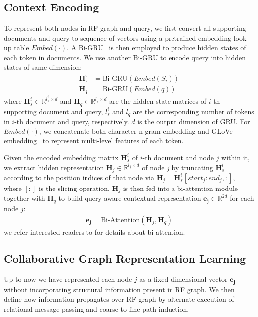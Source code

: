 \subsection{Context Encoding}
To represent both nodes in RF graph and query, we first convert all supporting documents and query to sequence of vectors using a pretrained embedding look-up table $Embed(\cdot)$. A Bi-GRU~\cite{DBLP:journals/corr/ChungGCB14} is then employed to produce hidden states of each token in documents. We use another Bi-GRU to encode query into hidden states of same dimension:
\begin{align}
	\bm{H}_s^i &= \text{Bi-GRU}(Embed(S_i)) \\
	\bm{H}_q &= \text{Bi-GRU}(Embed(q))
\end{align}
where $\bm{H}_s^i\in \mathbb{R}^{l_s^i\times d}$ and $\bm{H}_q\in \mathbb{R}^{l_q\times d}$ are the hidden state matrices of $i$-th supporting document and query, $l_s^i$ and $l_q$ are the corresponding number of tokens in $i$-th document and query, respectively. $d$ is the output dimension of GRU. For $Embed(\cdot)$, we concatenate both character n-gram embedding and GLoVe embedding~\cite{pennington2014glove} to represent multi-level features of each token.

Given the encoded embedding matrix $\bm{H}_s^i$ of $i$-th document and node $j$ within it, we extract hidden representation $\bm{H}_j\in \mathbb{R}^{l_j\times d}$ of node $j$ by truncating $\bm{H}_s^i$ according to the position indices of that node via $\bm{H}_j = \bm{H}_s^i[start_j:end_j, :]$,
where $[:]$ is the slicing operation. $\bm{H}_j$ is then fed into a bi-attention module~\cite{Zhong2019} together with $\bm{H}_q$ to build query-aware contextual representation $\bm{e_j}\in \mathbb{R}^{2d}$ for each node $j$:
\begin{align}
	\bm{e_j} = \text{Bi-Attention}(\bm{H}_j, \bm{H}_q)
\end{align}
we refer interested readers to \cite{Zhong2019} for details about bi-attention.

\subsection{Collaborative Graph Representation Learning}
Up to now we have represented each node $j$ as a fixed dimensional vector 
$\bm{e_j}$ without incorporating structural information present in RF graph. 
We then define how information propagates over RF graph by alternate execution 
of relational message passing and coarse-to-fine path induction.

